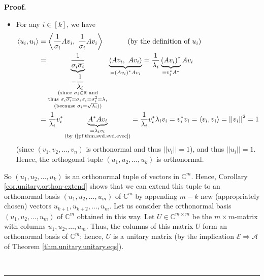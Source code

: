 \documentclass[numbers=enddot,12pt,final,onecolumn,notitlepage]{scrartcl}%
\numberwithin{exer}{subsection}
\theoremstyle{definition}
\newenvironment{proof}[1][Proof]{\noindent\textbf{#1.} }{\ \rule{0.5em}{0.5em}}
\begin{document}
\begin{proof}
\begin{itemize}
\item For any $i\in\left[  k\right]  $, we have%
\begin{align*}
\left\langle u_{i},u_{i}\right\rangle  &  =\left\langle \dfrac{1}{\sigma_{i}%
}Av_{i},\ \dfrac{1}{\sigma_{i}}Av_{i}\right\rangle \ \ \ \ \ \ \ \ \ \ \left(
\text{by the definition of }u_{i}\right) \\
&  =\underbrace{\dfrac{1}{\sigma_{i}\overline{\sigma_{i}}}}_{\substack{=\dfrac
{1}{\lambda_{i}}\\\text{(since }\sigma_{i}\in\mathbb{R}\text{ and}\\\text{thus
}\sigma_{i}\overline{\sigma_{i}}=\sigma_{i}\sigma_{i}=\sigma_{i}^{2}%
=\lambda_{i}\\\text{(because }\sigma_{i}=\sqrt{\lambda_{i}}\text{))}%
}}\underbrace{\left\langle Av_{i},\ Av_{i}\right\rangle }_{=\left(
Av_{i}\right)  ^{\ast}Av_{i}}=\dfrac{1}{\lambda_{i}}\underbrace{\left(
Av_{i}\right)  ^{\ast}}_{=v_{i}^{\ast}A^{\ast}}Av_{i}\\
&  =\dfrac{1}{\lambda_{i}}v_{i}^{\ast}\underbrace{A^{\ast}Av_{i}%
}_{\substack{=\lambda_{i}v_{i}\\\text{(by (\ref{pf.thm.svd.svd.evec})}%
}}=\dfrac{1}{\lambda_{i}}v_{i}^{\ast}\lambda_{i}v_{i}=v_{i}^{\ast}%
v_{i}=\left\langle v_{i},v_{i}\right\rangle =\left\vert \left\vert
v_{i}\right\vert \right\vert ^{2}=1
\end{align*}
(since $\left(  v_{1},v_{2},\ldots,v_{n}\right)  $ is orthonormal and thus
$\left\vert \left\vert v_{i}\right\vert \right\vert =1$), and thus $\left\vert
\left\vert u_{i}\right\vert \right\vert =1$. Hence, the orthogonal tuple
$\left(  u_{1},u_{2},\ldots,u_{k}\right)  $ is orthonormal.
\end{itemize}

So $\left(  u_{1},u_{2},\ldots,u_{k}\right)  $ is an orthonormal tuple of
vectors in $\mathbb{C}^{m}$. Hence, Corollary \ref{cor.unitary.orthon-extend}
shows that we can extend this tuple to an orthonormal basis $\left(
u_{1},u_{2},\ldots,u_{m}\right)  $ of $\mathbb{C}^{m}$ by appending $m-k$ new
(appropriately chosen) vectors $u_{k+1},u_{k+2},\ldots,u_{m}$. Let us consider
the orthonormal basis $\left(  u_{1},u_{2},\ldots,u_{m}\right)  $ of
$\mathbb{C}^{m}$ obtained in this way. Let $U\in\mathbb{C}^{m\times m}$ be the
$m\times m$-matrix with columns $u_{1},u_{2},\ldots,u_{m}$. Thus, the columns
of this matrix $U$ form an orthonormal basis of $\mathbb{C}^{m}$; hence, $U$
is a unitary matrix (by the implication $\mathcal{E}\Longrightarrow
\mathcal{A}$ of Theorem \ref{thm.unitary.unitary.eqs}).


\end{proof}
\end{document}
